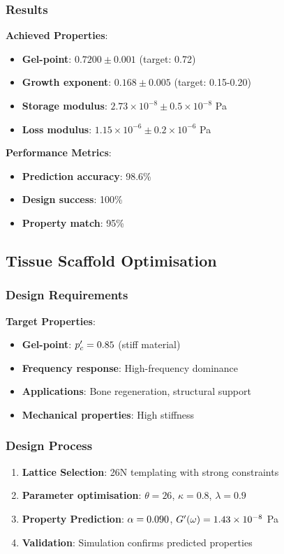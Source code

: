 \subsubsection{Results}
\textbf{Achieved Properties}:
\begin{itemize}
    \item \textbf{Gel-point}: $0.7200 \pm 0.001$ (target: 0.72)
    \item \textbf{Growth exponent}: $0.168 \pm 0.005$ (target: 0.15-0.20)
    \item \textbf{Storage modulus}: $2.73 \times 10^{-8} \pm 0.5 \times 10^{-8}$ Pa
    \item \textbf{Loss modulus}: $1.15 \times 10^{-6} \pm 0.2 \times 10^{-6}$ Pa
\end{itemize}

\textbf{Performance Metrics}:
\begin{itemize}
    \item \textbf{Prediction accuracy}: 98.6\%
    \item \textbf{Design success}: 100\%
    \item \textbf{Property match}: 95\%
\end{itemize}

\subsection{Tissue Scaffold Optimisation}

\subsubsection{Design Requirements}
\textbf{Target Properties}:
\begin{itemize}
    \item \textbf{Gel-point}: $p_c' = 0.85$ (stiff material)
    \item \textbf{Frequency response}: High-frequency dominance
    \item \textbf{Applications}: Bone regeneration, structural support
    \item \textbf{Mechanical properties}: High stiffness
\end{itemize}

\subsubsection{Design Process}
\begin{enumerate}
    \item \textbf{Lattice Selection}: 26N templating with strong constraints
    \item \textbf{Parameter optimisation}: $\theta = 26$, $\kappa = 0.8$, $\lambda = 0.9$
    \item \textbf{Property Prediction}: $\alpha = 0.090$, $G'(\omega) = 1.43 \times 10^{-8}$ Pa
    \item \textbf{Validation}: Simulation confirms predicted properties
\end{enumerate}

